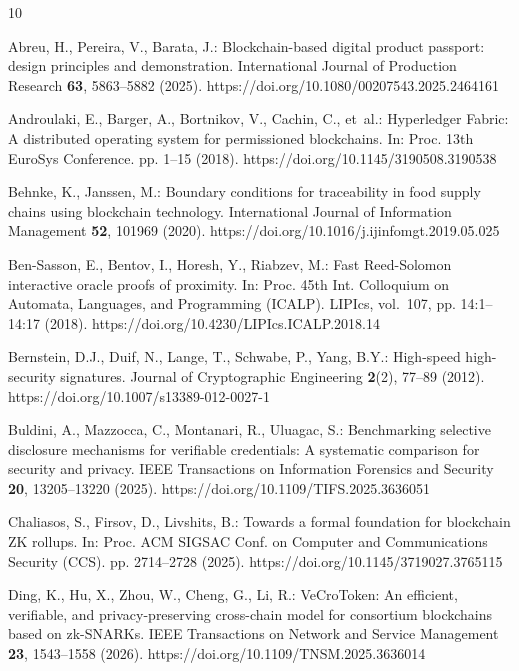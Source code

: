 \documentclass[runningheads]{llncs}
\begin{document}
\begin{thebibliography}{10}
\providecommand{\url}[1]{\texttt{#1}}
\providecommand{\urlprefix}{URL }
\providecommand{\doi}[1]{https://doi.org/#1}

Abreu, H., Pereira, V., Barata, J.: Blockchain-based digital product passport:
  design principles and demonstration. International Journal of Production
  Research  \textbf{63},  5863--5882 (2025).
  \doi{10.1080/00207543.2025.2464161}

Androulaki, E., Barger, A., Bortnikov, V., Cachin, C., et~al.: Hyperledger
  {Fabric}: A distributed operating system for permissioned blockchains. In:
  Proc. 13th EuroSys Conference. pp. 1--15 (2018).
  \doi{10.1145/3190508.3190538}

Behnke, K., Janssen, M.: Boundary conditions for traceability in food supply
  chains using blockchain technology. International Journal of Information
  Management  \textbf{52},  101969 (2020).
  \doi{10.1016/j.ijinfomgt.2019.05.025}

Ben-Sasson, E., Bentov, I., Horesh, Y., Riabzev, M.: Fast {Reed-Solomon}
  interactive oracle proofs of proximity. In: Proc. 45th Int. Colloquium on
  Automata, Languages, and Programming (ICALP). LIPIcs, vol.~107, pp.
  14:1--14:17 (2018). \doi{10.4230/LIPIcs.ICALP.2018.14}

Bernstein, D.J., Duif, N., Lange, T., Schwabe, P., Yang, B.Y.: High-speed
  high-security signatures. Journal of Cryptographic Engineering
  \textbf{2}(2),  77--89 (2012). \doi{10.1007/s13389-012-0027-1}

Buldini, A., Mazzocca, C., Montanari, R., Uluagac, S.: Benchmarking selective
  disclosure mechanisms for verifiable credentials: A systematic comparison for
  security and privacy. IEEE Transactions on Information Forensics and Security
   \textbf{20},  13205--13220 (2025). \doi{10.1109/TIFS.2025.3636051}

Chaliasos, S., Firsov, D., Livshits, B.: Towards a formal foundation for
  blockchain {ZK} rollups. In: Proc. ACM SIGSAC Conf. on Computer and
  Communications Security (CCS). pp. 2714--2728 (2025).
  \doi{10.1145/3719027.3765115}

Ding, K., Hu, X., Zhou, W., Cheng, G., Li, R.: {VeCroToken}: An efficient,
  verifiable, and privacy-preserving cross-chain model for consortium
  blockchains based on {zk-SNARKs}. IEEE Transactions on Network and Service
  Management  \textbf{23},  1543--1558 (2026). \doi{10.1109/TNSM.2025.3636014}


\end{thebibliography}
\end{document}
